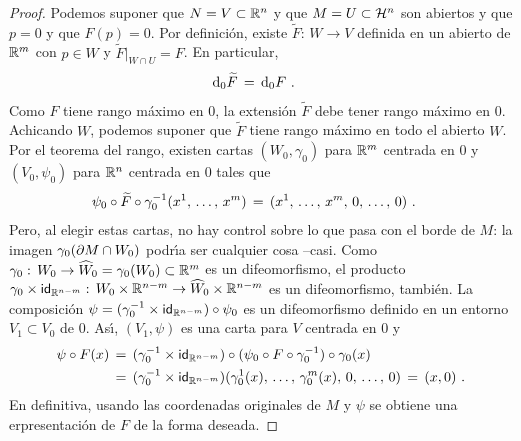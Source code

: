 \begin{proof}
	Podemos suponer que $N=V\subset\bb{R}^{n}$ y que
	$M=U\subset\hemi[n]$ son abiertos y que $p=0$ y que $F(p)=0$.
	Por definici\'{o}n, existe $\widetilde{F}:\,W\rightarrow V$ definida
	en un abierto de $\bb{R}^{m}$ con $p\in W$ y
	$\widetilde{F}|_{W\cap U}=F$. En particular,
	\begin{align*}
		\diferencial[0]{\widetilde{F}} & \,=\,\diferencial[0]{F}
		\text{ .}
	\end{align*}
	Como $F$ tiene rango m\'{a}ximo en $0$, la extensi\'{o}n
	$\widetilde{F}$ debe tener rango m\'{a}ximo en $0$. Achicando $W$,
	podemos suponer que $\widetilde{F}$ tiene rango m\'{a}ximo en
	todo el abierto $W$. Por el teorema del rango, existen cartas
	$(W_{0},\gamma_{0})$ para $\bb{R}^{m}$ centrada en $0$ y
	$(V_{0},\psi_{0})$ para $\bb{R}^{n}$ centrada en $0$ tales que
	\begin{align*}
		\psi_{0}\circ\widetilde{F}\circ\gamma_{0}^{-1}
			(\lista*{x}{m}) & \,=\,
			(\lista*{x}{m},\,0,\,\dots,\,0)
		\text{ .}
	\end{align*}
	Pero, al elegir estas cartas, no hay control sobre lo que pasa con
	el borde de $M$: la imagen $\gamma_{0}(\borde[M]\cap W_{0})$
	podr\'{\i}a ser cualquier cosa --casi. Como
	$\gamma_{0}:\,W_{0}\rightarrow\widehat{W}_{0}=\gamma_{0}(W_{0})%
	\subset\bb{R}^{m}$ es un difeomorfismo, el producto
	$\gamma_{0}\times\id[\bb{R}^{n-m}]:\,W_{0}\times\bb{R}^{n-m}%
	\rightarrow\widehat{W}_{0}\times\bb{R}^{n-m}$ es un difeomorfismo,
	tambi\'{e}n. La composici\'{o}n
	$\psi=(\gamma_{0}^{-1}\times\id[\bb{R}^{n-m}])\circ\psi_{0}$ es un
	difeomorfismo definido en un entorno $V_{1}\subset V_{0}$ de $0$.
	As\'{\i}, $(V_{1},\psi)$ es una carta para $V$ centrada en $0$ y
	\begin{align*}
		\psi\circ F (x) & \,=\,
			(\gamma_{0}^{-1}\times\id[\bb{R}^{n-m}])\circ
			(\psi_{0}\circ F\circ\gamma_{0}^{-1})\circ
			\gamma_{0}(x) \\
		& \,=\,(\gamma_{0}^{-1}\times\id[\bb{R}^{n-m}])
			(\gamma_{0}^{1}(x),\,\dots,\,\gamma_{0}^{m}(x),\,0,\,
				\dots,\,0) \,=\,(x,0)
		\text{ .}
	\end{align*}
	En definitiva, usando las coordenadas originales de $M$ y $\psi$
	se obtiene una erpresentaci\'{o}n de $F$ de la forma deseada.
\end{proof}

